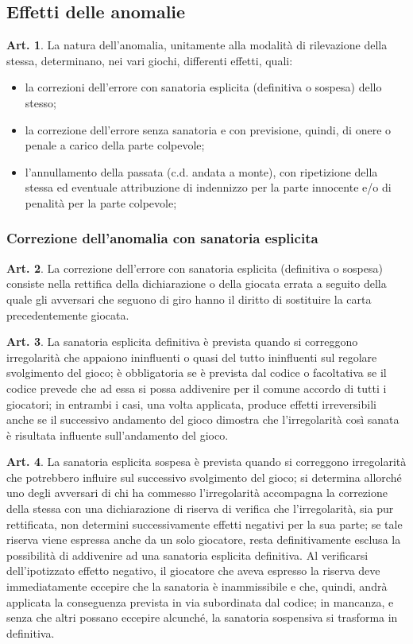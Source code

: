 \documentclass[italian,a4paper]{book}
\theoremstyle{definition}
\newtheorem{art}{Art.}
\newenvironment{packeditem}{
\begin{itemize}
  \setlength{\itemsep}{1pt}
  \setlength{\parskip}{0pt}
  \setlength{\parsep}{0pt}
}{\end{itemize}}
\begin{document}
\subsection{Effetti delle anomalie}
\begin{art}
    La natura dell'anomalia, unitamente alla modalità di rilevazione della stessa, determinano, nei vari giochi, differenti effetti, quali:
    \begin{packeditem}
\item      la correzioni dell'errore con sanatoria esplicita (definitiva o sospesa) dello stesso;
\item      la correzione dell'errore senza sanatoria e con previsione, quindi, di onere o penale a carico della parte colpevole;
\item      l'annullamento della passata (c.d. andata a monte), con ripetizione della stessa ed eventuale attribuzione di indennizzo per la parte innocente e/o di penalità per la parte colpevole;
    \end{packeditem}
\end{art}
\subsubsection{Correzione dell'anomalia con sanatoria esplicita}
\begin{art}
    La correzione dell'errore con sanatoria esplicita (definitiva o sospesa) consiste nella rettifica della dichiarazione o della giocata errata a seguito della quale gli avversari che seguono di giro hanno il diritto di sostituire la carta precedentemente giocata.
\end{art}
\begin{art}\label{san.espl}
    La sanatoria esplicita definitiva è prevista quando si correggono irregolarità che appaiono ininfluenti o quasi del tutto ininfluenti sul regolare svolgimento del gioco; è obbligatoria se è prevista dal codice o facoltativa se il codice prevede che ad essa si possa addivenire per il comune accordo di tutti i giocatori; in entrambi i casi, una volta applicata, produce effetti irreversibili anche se il successivo andamento del gioco dimostra che l'irregolarità così sanata è risultata influente sull'andamento del gioco.
\end{art}
\begin{art}
    La sanatoria esplicita sospesa è prevista quando si correggono irregolarità che potrebbero influire sul successivo svolgimento del gioco; si determina allorché uno degli avversari di chi ha commesso l'irregolarità accompagna la correzione della stessa con una dichiarazione di riserva di verifica che l'irregolarità, sia pur rettificata, non determini successivamente effetti negativi per la sua parte; se tale riserva viene espressa anche da un solo giocatore, resta definitivamente esclusa la possibilità di addivenire ad una sanatoria esplicita definitiva. Al verificarsi dell'ipotizzato effetto negativo, il giocatore che aveva espresso la riserva deve immediatamente eccepire che la sanatoria è inammissibile e che, quindi, andrà applicata la conseguenza prevista in via subordinata dal codice; in mancanza, e senza che altri possano eccepire alcunché, la sanatoria sospensiva si trasforma in definitiva.
\end{art}
\end{document}
